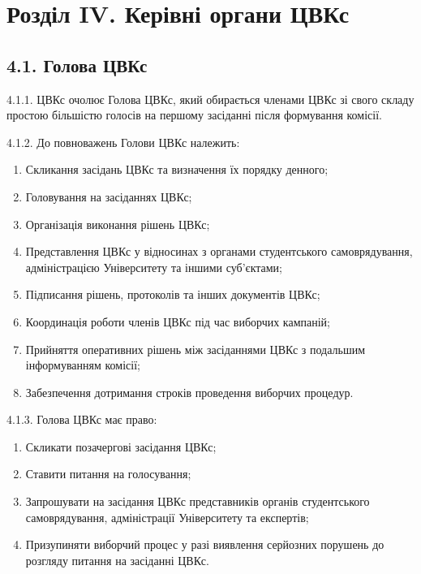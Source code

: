 \section*{Розділ IV. Керівні органи ЦВКс}

\subsection*{4.1. Голова ЦВКс}
    4.1.1. ЦВКс очолює Голова ЦВКс, який обирається членами ЦВКс зі свого складу простою більшістю голосів на першому засіданні після формування комісії.

    4.1.2. До повноважень Голови ЦВКс належить:

        \begin{enumerate}[label=\alph*)]
            \item Скликання засідань ЦВКс та визначення їх порядку денного;
            \item Головування на засіданнях ЦВКс;
            \item Організація виконання рішень ЦВКс;
            \item Представлення ЦВКс у відносинах з органами студентського самоврядування, адміністрацією Університету та іншими суб'єктами;
            \item Підписання рішень, протоколів та інших документів ЦВКс;
            \item Координація роботи членів ЦВКс під час виборчих кампаній;
            \item Прийняття оперативних рішень між засіданнями ЦВКс з подальшим інформуванням комісії;
            \item Забезпечення дотримання строків проведення виборчих процедур.
        \end{enumerate}

    4.1.3. Голова ЦВКс має право:

        \begin{enumerate}[label=\alph*)]
            \item Скликати позачергові засідання ЦВКс;
            \item Ставити питання на голосування;
            \item Запрошувати на засідання ЦВКс представників органів студентського самоврядування, адміністрації Університету та експертів;
            \item Призупиняти виборчий процес у разі виявлення серйозних порушень до розгляду питання на засіданні ЦВКс.
        \end{enumerate}

